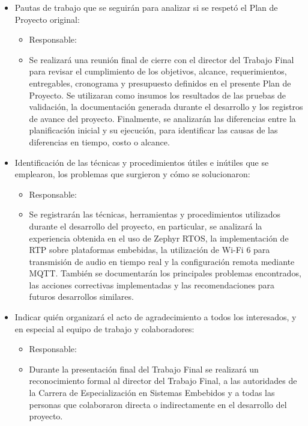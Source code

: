 \documentclass[
11pt, %
]{charter}
\begin{document}
\begin{itemize}
	\item Pautas de trabajo que se seguirán para analizar si se respetó el Plan de Proyecto original:
	\begin{itemize}
		\item Responsable: \authorname
		\item Se realizará una reunión final de cierre con el director del Trabajo Final para revisar el cumplimiento de los objetivos, alcance, requerimientos, entregables, cronograma y presupuesto definidos en el presente Plan de Proyecto. Se utilizaran como insumos los resultados de las pruebas de validación, la documentación generada durante el desarrollo y los registros de avance del proyecto. Finalmente, se analizarán las diferencias entre la planificación inicial y su ejecución, para identificar las causas de las diferencias en tiempo, costo o alcance.
	\end{itemize}
	
	\item Identificación de las técnicas y procedimientos útiles e inútiles que se emplearon, los problemas que surgieron y cómo se solucionaron:
	\begin{itemize}
		\item Responsable: \authorname
		\item Se registrarán las técnicas, herramientas y procedimientos utilizados durante el desarrollo del proyecto, en particular, se analizará la experiencia obtenida en el uso de Zephyr RTOS, la implementación de RTP sobre plataformas embebidas, la utilización de Wi-Fi 6 para transmisión de audio en tiempo real y la configuración remota mediante MQTT. También se documentarán los principales problemas encontrados, las acciones correctivas implementadas y las recomendaciones para futuros desarrollos similares.
	\end{itemize}
	
	\item Indicar quién organizará el acto de agradecimiento a todos los interesados, y en especial al equipo de trabajo y colaboradores:
	\begin{itemize}
		\item Responsable: \authorname
		\item Durante la presentación final del Trabajo Final se realizará un reconocimiento formal al director del Trabajo Final, a las autoridades de la Carrera de Especialización en Sistemas Embebidos y a todas las personas que colaboraron directa o indirectamente en el desarrollo del proyecto.
	\end{itemize}
\end{itemize}
\end{document}
